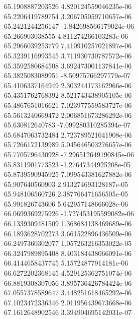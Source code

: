 {65.1908887203526 4.820124559046235e-06 \\
65.2206419789754 3.206705059710657e-06 \\
65.2421244256147 -1.842698566179024e-06 \\
65.266903038555 4.811274266103283e-06 \\
65.2966039253779 7.410910257021897e-06 \\
65.3239116993545 3.711930730787572e-06 \\
65.3592580684508 3.692473001137841e-06 \\
65.3825083089951 -8.50975766297779e-07 \\
65.4106337164949 2.303244173162966e-06 \\
65.4351762768392 8.521743438905105e-06 \\
65.4867651016621 7.023977559583727e-06 \\
65.5613240669472 2.006851673286292e-06 \\
65.630812640783 -7.099280310285394e-07 \\
65.6847063732484 2.723789521041908e-06 \\
65.7266172139989 5.045646503276657e-06 \\
65.7705796430928 -7.296512649190845e-06 \\
65.8311901773523 -1.27647344925208e-05 \\
65.8739590945925 7.099543381627882e-06 \\
65.907640560903 2.913274693128187e-05 \\
65.948106560726 2.387766471656505e-05 \\
65.991826743606 5.642957148666028e-06 \\
66.0699369275926 -1.727453195599082e-06 \\
66.1339309481509 1.368684138469689e-06 \\
66.1893628702273 3.661522896436509e-06 \\
66.2497360302077 1.057263216353022e-05 \\
66.3247989895408 8.403184438066091e-06 \\
66.4144658437745 5.15724877914181e-06 \\
66.6272202368145 4.529125362751074e-06 \\
66.8819308307056 3.895736426784424e-06 \\
67.0557378589647 3.448251618465292e-06 \\
67.1023472336346 2.011956439673668e-06 \\
67.1612648902546 3.394904695142031e-07 \\
}
